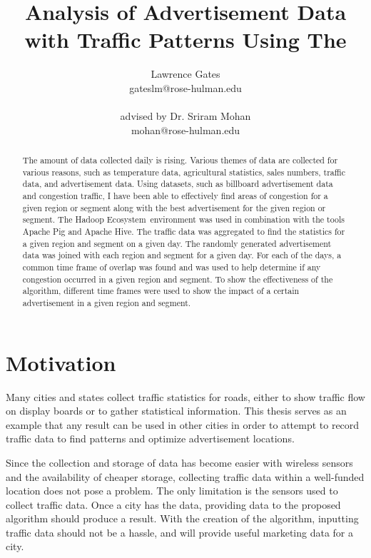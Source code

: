 \documentclass[titlepage,twocolumn]{article}
\title{Analysis of Advertisement Data with Traffic Patterns Using The \HadoopEcosystem}
\author{Lawrence Gates \\ 
	{gateslm@rose-hulman.edu} \\ \\
	advised by Dr. Sriram Mohan \\ {mohan@rose-hulman.edu}
}
\newcommand{\HadoopEcosystem}{Hadoop Ecosystem}
\begin{document}
\maketitle
\onecolumn
\tableofcontents
\twocolumn

\begin{abstract}
	The amount of data collected daily is rising. Various themes of data are collected for various reasons, such as temperature data, agricultural statistics, sales numbers, traffic data, and advertisement data. Using datasets, such as billboard advertisement data and congestion traffic, I have been able to effectively find areas of congestion for a given region or segment along with the best advertisement for the given region or segment. The \HadoopEcosystem\ environment was used in combination with the tools Apache Pig and Apache Hive. The traffic data was aggregated to find the statistics for a given region and segment on a given day. The randomly generated advertisement data was joined with each region and segment for a given day. For each of the days, a common time frame of overlap was found and was used to help determine if any congestion occurred in a given region and segment. To show the effectiveness of the algorithm, different time frames were used to show the impact of a certain advertisement in a given region and segment. 
\end{abstract}

\section{Motivation}

\par Many cities and states collect traffic statistics for roads, either to show traffic flow on display boards or to gather statistical information. This thesis serves as an example that any result can be used in other cities in order to attempt to record traffic data to find patterns and optimize advertisement locations. 
\par
Since the collection and storage of data has become easier with wireless sensors and the availability of cheaper storage, collecting traffic data within a well-funded location does not pose a problem. The only limitation is the sensors used to collect traffic data. Once a city has the data, providing data to the proposed algorithm should produce a result. With the creation of the algorithm, inputting traffic data should not be a hassle, and will provide useful marketing data for a city. 
\end{document}
